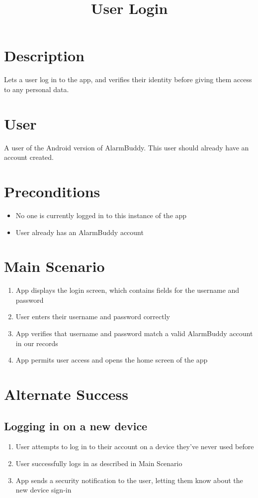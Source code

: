 \documentclass{article}
\begin{document}
\title{User Login}
\date{}
\maketitle{}

\section{Description}
Lets a user log in to the app, and verifies their identity before giving them access to any personal data.

\section{User}
A user of the Android version of AlarmBuddy. This user should already have an account created.

\section{Preconditions}
	\begin{itemize}
		\item No one is currently logged in to this instance of the app
		\item User already has an AlarmBuddy account
	\end{itemize}

\section{Main Scenario}
	\begin{enumerate}
		\item App displays the login screen, which contains fields for the username and password
		\item User enters their username and password correctly
		\item App verifies that username and password match a valid AlarmBuddy account in our records
		\item App permits user access and opens the home screen of the app
	\end{enumerate}

\section{Alternate Success}
	\subsection{Logging in on a new device}
		\begin{enumerate}
			\item User attempts to log in to their account on a device they've never used before
			\item User successfully logs in as described in Main Scenario
			\item App sends a security notification to the user, letting them know about the new device sign-in
		\end{enumerate}
\end{document}

